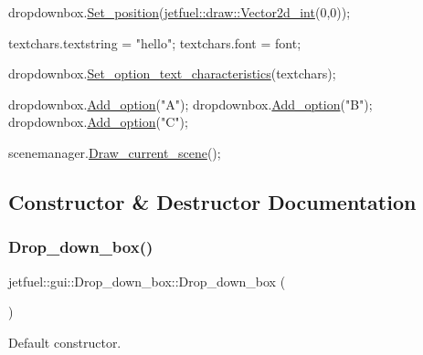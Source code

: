 \begin{DoxyCode}
dropdownbox.\hyperlink{classjetfuel_1_1gui_1_1Drop__down__box_acba86706261397994c96727a0184a78c}{Set\_position}(\hyperlink{classjetfuel_1_1draw_1_1Vector2d}{jetfuel::draw::Vector2d\_int}(0,0));

textchars.textstring = \textcolor{stringliteral}{"hello"};
textchars.font = font;


dropdownbox.\hyperlink{classjetfuel_1_1gui_1_1Drop__down__box_a051d83177f8fa26325dcbdc504ccb0a9}{Set\_option\_text\_characteristics}(textchars);

dropdownbox.\hyperlink{classjetfuel_1_1gui_1_1Drop__down__box_a2dd70d6c3982232965ecc9b7079b6144}{Add\_option}(\textcolor{stringliteral}{"A"});
dropdownbox.\hyperlink{classjetfuel_1_1gui_1_1Drop__down__box_a2dd70d6c3982232965ecc9b7079b6144}{Add\_option}(\textcolor{stringliteral}{"B"});
dropdownbox.\hyperlink{classjetfuel_1_1gui_1_1Drop__down__box_a2dd70d6c3982232965ecc9b7079b6144}{Add\_option}(\textcolor{stringliteral}{"C"});

scenemanager.\hyperlink{classjetfuel_1_1draw_1_1Scene__manager_a8af9a3abfd5121b1b8556342de435773}{Draw\_current\_scene}();
\end{DoxyCode}
 

\subsection{Constructor \& Destructor Documentation}
\mbox{\label{classjetfuel_1_1gui_1_1Drop__down__box_af518d68503aa67f76e70fd4e2d9c3cb3}} 
\subsubsection{\texorpdfstring{Drop\+\_\+down\+\_\+box()}{Drop\_down\_box()}}
{\footnotesize\ttfamily jetfuel\+::gui\+::\+Drop\+\_\+down\+\_\+box\+::\+Drop\+\_\+down\+\_\+box (\begin{DoxyParamCaption}{ }\end{DoxyParamCaption})\hspace{0.3cm}{\ttfamily [inline]}}



Default constructor. 

